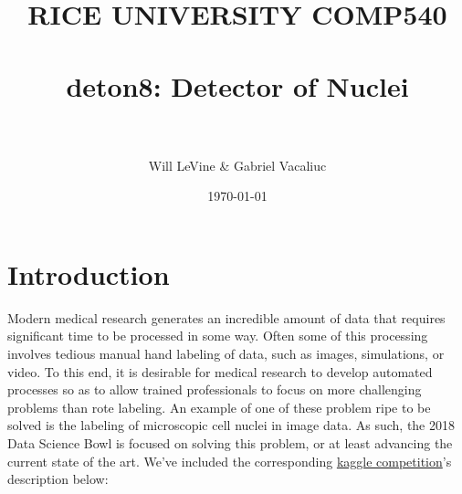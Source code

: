 \documentclass[paper=letter, fontsize=12pt]{article}
\title{	
\normalfont \normalsize 
\textsc{RICE UNIVERSITY COMP540} \\ [25pt]
\horrule{0.5pt} \\[0.4cm] %
\huge deton8: Detector of Nuclei \\ %
\horrule{2pt} \\[0.5cm] %
}
\author{Will LeVine \& Gabriel Vacaliuc}
\date{\normalsize\today}
\numberwithin{equation}{section} %
\numberwithin{figure}{section} %
\numberwithin{table}{section} %
\begin{document}
\maketitle

\begin{abstract}
    \blindtext
\end{abstract}

\newpage

\tableofcontents

\newpage



\section{Introduction}

Modern medical research generates an incredible amount of data that requires
significant time to be processed in some way.  Often some of this processing
involves tedious manual hand labeling of data, such as images, simulations, or
video.  To this end, it is desirable for medical research to develop automated
processes so as to allow trained professionals to focus on more challenging
problems than rote labeling.  An example of one of these problem ripe to be
solved is the labeling of microscopic cell nuclei in image data.  As such, the
2018 Data Science Bowl is focused on solving this problem, or at least
advancing the current state of the art.  We've included the corresponding
\href{https://www.kaggle.com/c/data-science-bowl-2018}{kaggle competition}'s
description below:
\end{document}
